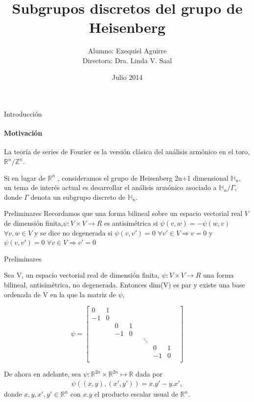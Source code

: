 \documentclass{beamer}
\author{Alumno: Exequiel Aguirre \\ Directora: Dra. Linda V. Saal}
\title{Subgrupos discretos del grupo de Heisenberg }
\date{Julio 2014}
\begin{document}
\maketitle


\begin{frame}{Introducción}
\framesubtitle{Motivación}
La teoría de series de Fourier es la versión clásica del análisis armónico en el toro,
$\mathbb{R}^n /\mathbb{Z}^n$.

Si en lugar de $\mathbb{R}^n$ , consideramos el grupo de Heisenberg 2n+1 dimensional $\mathbb{H}_n$, un tema
de interés actual es desarrollar el análisis armónico asociado a $\mathbb{H}_n/\Gamma$, donde $\Gamma$ 
denota un subgrupo discreto de $\mathbb{H}_n$. 
\end{frame}


\begin{frame}{Preliminares}
Recordamos que una forma bilineal sobre un espacio vectorial real $V$ de dimensión finita,$\psi :V\times V\rightarrow R$
es antisimétrica si $\psi(v,w)=-\psi(w,v)$ $\forall v,w \in V$  y se dice no degenerada si 
$\psi(v,v')=0$ $\forall v' \in V \Rightarrow v = 0$  y 
$\psi(v,v')=0$ $\forall v \in V \Rightarrow v' = 0$
\end{frame}

\begin{frame}{Preliminares}
\begin{theorem} \label{Lang-8.1}
 Sea V, un espacio vectorial real de dimensión finita, $\psi :V\times V\rightarrow R$ una forma bilineal, antisimétrica, no degenerada.
  Entonces dim(V) es par y existe una base ordenada de V en la que la matriz de $\psi$,
 
$$\psi = 
\begin{bmatrix}
 0 & 1 & & & & & & &\\ 
 -1& 0 & & & & & & &\\
 & & 0 & 1 & & & & &\\
 & & -1 & 0 & & & & &\\
 & &  &  & & \ddots & & &\\
 & &  &  & & & 0 & 1 &\\
 & &  &  & & & -1 & 0 &\\ 
\end{bmatrix}
$$
\end{theorem}

De ahora en adelante, sea $\psi :\mathbb{R}^{2n} \times \mathbb{R}^{2n}\mapsto \mathbb{R}$ dada por 
$$ \begin{aligned}
\psi((x,y),(x',y'))=x.y'-y.x' ,
\end{aligned}$$
donde $x,y,x',y' \in \mathbb{R}^n$ con  $x.y$ el producto escalar usual de $\mathbb{R}^n$.
\end{frame}
\end{document}
